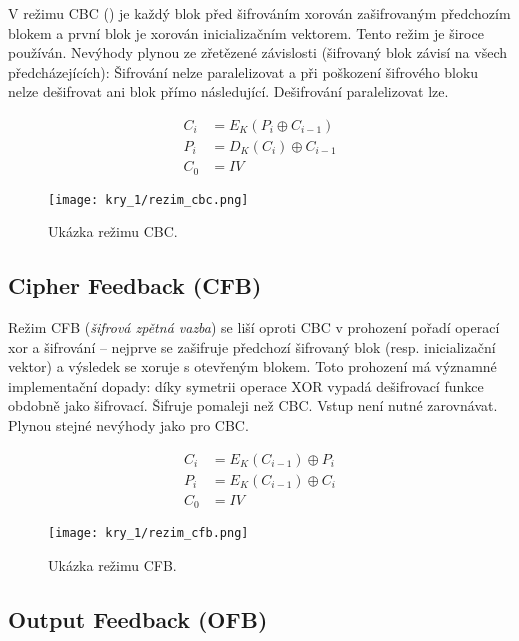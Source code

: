 V režimu CBC () je každý blok před šifrováním xorován zašifrovaným předchozím blokem a první blok je xorován inicializačním vektorem. Tento režim je široce používán. Nevýhody plynou ze zřetězené závislosti (šifrovaný blok závisí na všech předcházejících): Šifrování nelze paralelizovat a při poškození šifrového bloku nelze dešifrovat ani blok přímo následující. Dešifrování paralelizovat lze.

\begin{equation}
\begin{aligned}
C_i &= E_K (P_i \oplus C_{i-1}) \\
P_i &= D_K(C_i) \oplus C_{i-1} \\
C_0 &= IV
\end{aligned}
\end{equation}

\begin{figure}[H]
    \centering
    \texttt{[image: kry\_1/rezim\_cbc.png]}
    \caption{Ukázka režimu CBC.}
\end{figure}

\subsection*{Cipher Feedback (CFB)}

Režim CFB (\textit{šifrová zpětná vazba}) se liší oproti CBC v prohození pořadí operací xor a šifrování -- nejprve se zašifruje předchozí šifrovaný blok (resp. inicializační vektor) a výsledek se xoruje s otevřeným blokem. Toto prohození má významné implementační dopady: díky symetrii operace XOR vypadá dešifrovací funkce obdobně jako šifrovací. Šifruje pomaleji než CBC. Vstup není nutné zarovnávat. Plynou stejné nevýhody jako pro CBC.

\begin{equation}
\begin{aligned}
C_i &= E_K (C_{i-1}) \oplus P_i \\
P_i &= E_K (C_{i-1}) \oplus C_i \\
C_0 &= IV
\end{aligned}
\end{equation}

\begin{figure}[H]
    \centering
    \texttt{[image: kry\_1/rezim\_cfb.png]}
    \caption{Ukázka režimu CFB.}
\end{figure}

\subsection*{Output Feedback (OFB)}

